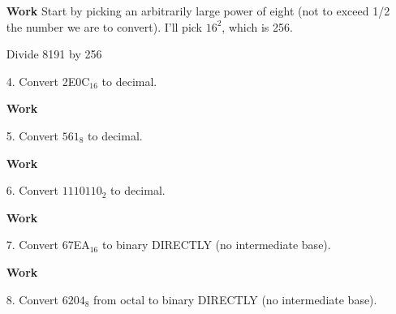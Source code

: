 \documentclass[12pt]{article}
\begin{document}
\begin{enumerate}
  \item[\textbf{Work}] Start by picking an arbitrarily large power of eight (not to exceed 1/2 the number we are to convert). I'll pick $16^2$, which is 256.
  \item[] Divide 8191 by 256
\end{enumerate}

\begin{enumerate}
\item[4.] Convert 2E0C$_{16}$ to decimal.
\end{enumerate}

\begin{enumerate}
  \item[\textbf{Work}]
\end{enumerate}

\begin{enumerate}
\item[5.] Convert $561_8$ to decimal.
\end{enumerate}

\begin{enumerate}
  \item[\textbf{Work}]
\end{enumerate}


\begin{enumerate}
\item[6.] Convert $1110110_2$ to decimal.
\end{enumerate}

\begin{enumerate}
  \item[\textbf{Work}]
\end{enumerate}


\begin{enumerate}
\item[7.] Convert 67EA$_{16}$ to binary DIRECTLY (no intermediate base).
\end{enumerate}

\begin{enumerate}
  \item[\textbf{Work}]
\end{enumerate}


\begin{enumerate}
\item[8.] Convert $6204_8$ from octal to binary DIRECTLY (no intermediate base).
\end{enumerate}
\end{document}
